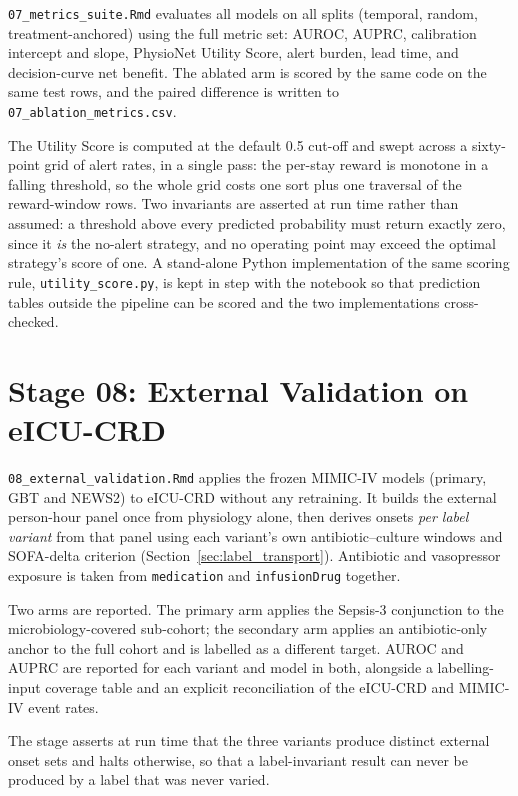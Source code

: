 \texttt{07\_metrics\_suite.Rmd} evaluates all models on all splits (temporal,
random, treatment-anchored) using the full metric set: AUROC, AUPRC, calibration
intercept and slope, PhysioNet Utility Score, alert burden, lead time, and
decision-curve net benefit. The ablated arm is scored by the same code on the
same test rows, and the paired difference is written to
\texttt{07\_ablation\_metrics.csv}.

The Utility Score is computed at the default 0.5 cut-off and swept across a
sixty-point grid of alert rates, in a single pass: the per-stay reward is
monotone in a falling threshold, so the whole grid costs one sort plus one
traversal of the reward-window rows. Two invariants are asserted at run time
rather than assumed: a threshold above every predicted probability must
return exactly zero, since it \emph{is} the no-alert strategy, and no operating
point may exceed the optimal strategy's score of one. A stand-alone Python
implementation of the same scoring rule, \texttt{utility\_score.py}, is kept in
step with the notebook so that prediction tables outside the pipeline can be
scored and the two implementations cross-checked.


\section{Stage 08: External Validation on eICU-CRD}

\texttt{08\_external\_validation.Rmd} applies the frozen MIMIC-IV models
(primary, GBT and NEWS2) to eICU-CRD without any retraining. It builds the
external person-hour panel once from physiology alone, then derives onsets
\emph{per label variant} from that panel using each variant's own
antibiotic--culture windows and SOFA-delta criterion
(Section~\ref{sec:label_transport}). Antibiotic and vasopressor exposure is
taken from \texttt{medication} and \texttt{infusionDrug} together.

Two arms are reported. The primary arm applies the Sepsis-3 conjunction to the
microbiology-covered sub-cohort; the secondary arm applies an antibiotic-only
anchor to the full cohort and is labelled as a different target. AUROC and
AUPRC are reported for each variant and model in both, alongside a
labelling-input coverage table and an explicit reconciliation of the eICU-CRD
and MIMIC-IV event rates.

The stage asserts at run time that the three variants produce distinct external
onset sets and halts otherwise, so that a label-invariant result can never be
produced by a label that was never varied.


